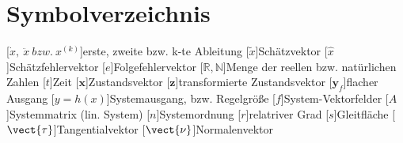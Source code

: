 \chapter*{Symbolverzeichnis}
\begin{acronym}[LabVIEW] %
	[\ensuremath{\dot{x},\ \ddot{x}\ bzw.\ x^{(k)}}]{erste, zweite bzw. k-te Ableitung}
	[\ensuremath{\tilde{x}}]{Schätzvektor}
	[\ensuremath{\hat{x}}]{Schätzfehlervektor}
	[\ensuremath{e}]{Folgefehlervektor}
	[\ensuremath{\mathbb{R},\mathbb{N}}]{Menge der reellen bzw. natürlichen Zahlen}
	[\ensuremath{t}]{Zeit}
	[\ensuremath{\mathbold{x}}]{Zustandsvektor}
	[\ensuremath{\mathbold{z}}]{transformierte Zustandsvektor}
	[\ensuremath{\mathbold{y}_f}]{flacher Ausgang}
	[\ensuremath{y = h(x)}]{Systemausgang, bzw. Regelgröße}
	[\ensuremath{f}]{System-Vektorfelder}
	[\ensuremath{A}]{Systemmatrix (lin. System)}
	[\ensuremath{n}]{Systemordnung}
	[\ensuremath{r}]{relatriver Grad}
	[\ensuremath{s}]{Gleitfläche}
	[\ensuremath{\vect{\tau}}]{Tangentialvektor}
	[\ensuremath{\vect{\nu}}]{Normalenvektor}
\end{acronym}